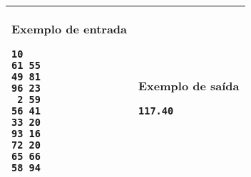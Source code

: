 \begin{table}[!h]
\centering
\begin{tabular}{|l|l|}
\hline
\begin{minipage}[t]{3in}
\textbf{Exemplo de entrada}
\begin{verbatim}
10
61 55
49 81
96 23
 2 59
56 41
33 20
93 16
72 20
65 66
58 94
\end{verbatim}
\vspace{1mm}
\end{minipage}
&
\begin{minipage}[t]{3in}
\textbf{Exemplo de saída}
\begin{verbatim}
117.40
\end{verbatim}
\vspace{1mm}
\end{minipage} \\
\hline
\end{tabular}
\end{table}
